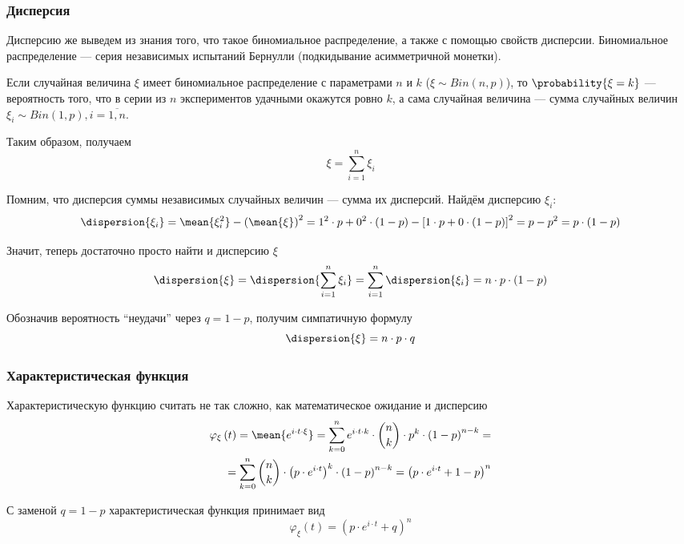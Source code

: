 \subsubsection{Дисперсия}
Дисперсию же выведем из знания того,
что такое биномиальное распределение, а также с помощью свойств дисперсии.
Биномиальное распределение --- серия независимых испытаний Бернулли
(подкидывание асимметричной монетки).

Если случайная величина $\xi$ имеет биномиальное распределение
с параметрами $n$ и $k$ ($\xi \sim Bin\left( n,p \right)$), то
$\probability{\xi=k}$ --- вероятность того,
что в серии из $n$ экспериментов удачными окажутся ровно $k$,
а сама случайная величина --- сумма случайных величин
$\xi_i \sim Bin\left( 1,p \right), i=\overline{1,n}$.

Таким образом, получаем
$$\xi = \sum_{i=1}^n \xi_i$$

Помним, что дисперсия суммы независимых случайных величин --- сумма
их дисперсий. Найдём дисперсию $\xi_i$:
$$\dispersion{\xi_i}
    = \mean{\xi_i^2} - \left( \mean{\xi} \right)^2
    = 1^2 \cdot p + 0^2 \cdot \left( 1-p \right)
        - \left[ 1 \cdot p + 0 \cdot \left( 1-p \right) \right]^2
    = p - p^2 = p \cdot \left( 1-p \right)$$

Значит, теперь достаточно просто найти и дисперсию $\xi$
$$\dispersion{\xi}
    = \dispersion{\sum_{i=1}^n \xi_i}
    = \sum_{i=1}^n \dispersion{\xi_i}
    = n \cdot p \cdot \left( 1-p \right)$$

Обозначив вероятность ``неудачи'' через $q=1-p$, получим симпатичную формулу
$$\dispersion{\xi} = n \cdot p \cdot q$$

\subsubsection{Характеристическая функция}
Характеристическую функцию считать не так сложно,
как математическое ожидание и дисперсию
\begin{align*}
    \varphi_{\xi}\left( t \right)
        = \mean{e^{i \cdot t \cdot \xi}}
        = \sum_{k=0}^{n} e^{i \cdot t \cdot k}
            \cdot \binom{n}{k} \cdot p^k \cdot \left( 1-p \right)^{n-k} = \\
        = \sum_{k=0}^{n} \binom{n}{k}
            \cdot \left(p \cdot e^{i \cdot t}\right)^k
            \cdot \left( 1-p \right)^{n-k}
        = \left( p \cdot e^{i\cdot t} + 1 - p \right)^n
\end{align*}

С заменой $q=1-p$ характеристическая функция принимает вид
$$\varphi_{\xi}\left( t \right) = \left( p \cdot e^{i\cdot t} + q \right)^n$$

